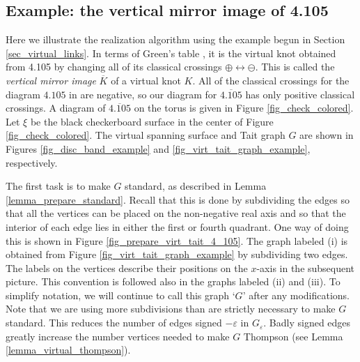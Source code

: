 \documentclass[11pt, twoside]{amsart}
\numberwithin{equation}{section}
\theoremstyle{definition}
\numberwithin{equation}{section}
\begin{document}
\subsection{Example: the vertical mirror image of 4.105} \label{sec_example} Here we illustrate the realization algorithm using the example begun in Section \ref{sec_virtual_links}. In terms of Green's table \cite{green}, it is the virtual knot obtained from 4.105 by changing all of its classical crossings $\oplus \leftrightarrow \ominus$. This is called the \emph{vertical mirror image} $\overline{K}$ of a virtual knot $K$. All of the classical crossings for the diagram $4.105$ in \cite{green} are negative, so our diagram for $\overline{4.105}$ has only positive classical crossings. A diagram of $\overline{4.105}$ on the torus is given in Figure \ref{fig_check_colored}. Let $\xi$ be the black checkerboard surface in the center of Figure \ref{fig_check_colored}. The virtual spanning surface and Tait graph $G$ are shown in Figures  \ref{fig_disc_band_example} and \ref{fig_virt_tait_graph_example}, respectively. 

The first task is to make $G$ standard, as described in Lemma \ref{lemma_prepare_standard}. Recall that this is done by subdividing the edges so that all the vertices can be placed on the non-negative real axis and so that the interior of each edge lies in either the first or fourth quadrant. One way of doing this is shown in Figure \ref{fig_prepare_virt_tait_4_105}. The graph labeled (i) is obtained from Figure \ref{fig_virt_tait_graph_example} by subdividing two edges. The labels on the vertices describe their positions on the $x$-axis in the subsequent picture. This convention is followed also in the graphs labeled (ii) and (iii). To simplify notation, we will continue to call this graph `$G$' after any modifications. Note that we are using more subdivisions than are strictly necessary to make $G$ standard. This reduces the number of edges signed $-\varepsilon$ in $G_{\varepsilon}$. Badly signed edges greatly increase the number vertices needed to make $G$ Thompson (see Lemma \ref{lemma_virtual_thompson}).
\end{document}
